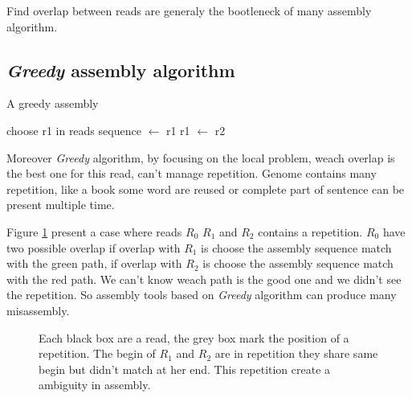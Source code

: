 \documentclass[main.tex]{subfiles}
\begin{document}
Find overlap between reads are generaly the bootleneck of many assembly algorithm.

\subsection{\textit{Greedy} assembly algorithm}


\begin{algorithm}[ht]
    \caption{A greedy assembly}
    \begin{algorithmic}[1]
        \State choose r1 in reads
        \State sequence $\leftarrow$ r1
            \State {}
            \State {}
            \State r1 $\leftarrow$ r2
        \EndWhile
    \EndFunction
    \end{algorithmic}
    \label{intro:algo:greedy}
\end{algorithm}

Moreover \textit{Greedy} algorithm, by focusing on the local problem, weach overlap is the best one for this read, can't manage repetition. Genome contains many repetition, like a book some word are reused or complete part of sentence can be present multiple time.

Figure \ref{intro:fig:greedy:repetition} present a case where reads $R_0$ $R_1$ and $R_2$ contains a repetition. $R_0$ have two possible overlap if overlap with $R_1$ is choose the assembly sequence match with the green path, if overlap with $R_2$ is choose the assembly sequence match with the red path. We can't know weach path is the good one and we didn't see the repetition. So assembly tools based on \textit{Greedy} algorithm can produce many misassembly.

\begin{figure}[ht]
    \centering 
    
    \caption{Each black box are a read, the grey box mark the position of a repetition. The begin of $R_1$ and $R_2$ are in repetition they share same begin but didn't match at her end. This repetition create a ambiguity in assembly.}
    \label{intro:fig:greedy:repetition}
\end{figure}
\end{document}
